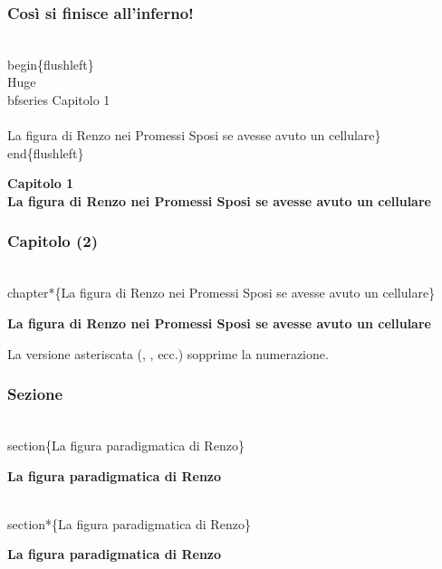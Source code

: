 \documentclass[svgnames,%
	ucs,%
	pdftex]{guitbeamer}
\begin{document}
\begin{frame}
  \frametitle{Così si finisce all'inferno!}
	\begin{LaTeXcode}
		\\begin\{flushleft\}\n
		\\Huge \\bfseries Capitolo 1\\\\ \n
		La figura di Renzo nei Promessi Sposi se avesse
		avuto un cellulare\}\n
		\\end\{flushleft\}	
	\end{LaTeXcode}
	\begin{LaTeXoutput}\Large\bfseries
		\noindent Capitolo 1\\[2ex]
		\noindent La figura di Renzo nei Promessi Sposi se avesse avuto un cellulare
	\end{LaTeXoutput}
\end{frame}
\begin{frame}
  \frametitle{Capitolo (2)}
	\begin{LaTeXcode}
		\alert{\\chapter*\{}La figura di Renzo nei Promessi Sposi se avesse avuto un cellulare\alert{\}}
	\end{LaTeXcode}
	\begin{LaTeXoutput}\Large\bfseries
		\vspace{2ex}
		\noindent La figura di Renzo nei Promessi Sposi se avesse avuto un cellulare
	\end{LaTeXoutput}
  \bigskip
	La versione asteriscata	(, , ecc.) sopprime la
	numerazione. %
\end{frame}
\begin{frame}
  \frametitle{Sezione}
	\begin{LaTeXcode}
		\alert{\\section\{}La figura paradigmatica di Renzo\alert{\}}
	\end{LaTeXcode}
	\begin{LaTeXoutput}\Large\bfseries
		\quad La figura paradigmatica di Renzo
	\end{LaTeXoutput}
  \medskip
	\begin{LaTeXcode}
		\alert{\\section*\{}La figura paradigmatica di Renzo\alert{\}}
	\end{LaTeXcode}
	\begin{LaTeXoutput}\Large\bfseries
		\noindent La figura paradigmatica di Renzo
	\end{LaTeXoutput}
\end{frame}
\end{document}

